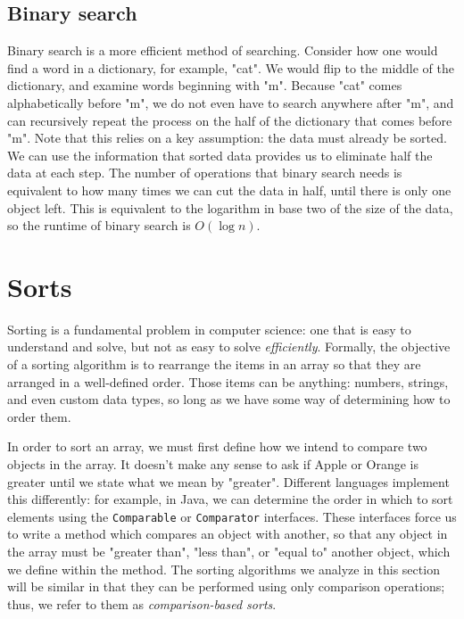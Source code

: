 \subsection{Binary search}

Binary search is a more efficient method of searching.  Consider how one would find a word in a dictionary, for example, "cat".  We would flip to the middle of the dictionary, and examine words beginning with "m".  Because "cat" comes alphabetically before "m", we do not even have to search anywhere after "m", and can recursively repeat the process on the half of the dictionary that comes before "m".  Note that this relies on a key assumption: the data must already be sorted.  We can use the information that sorted data provides us to eliminate half the data at each step.  The number of operations that binary search needs is equivalent to how many times we can cut the data in half, until there is only one object left.  This is equivalent to the logarithm in base two of the size of the data, so the runtime of binary search is $ O(\log n) $.


\section{Sorts} \label{sec:sorts}

Sorting is a fundamental problem in computer science: one that is easy to understand and solve, but not as easy to solve \textit{efficiently}. Formally, the objective of a sorting algorithm is to rearrange the items in an array so that they are arranged in a well-defined order. Those items can be anything: numbers, strings, and even custom data types, so long as we have some way of determining how to order them.

In order to sort an array, we must first define how we intend to compare two objects in the array.  It doesn't make any sense to ask if Apple or Orange is greater until we state what we mean by "greater".  Different languages implement this differently: for example, in Java, we can determine the order in which to sort elements using the \texttt{Comparable} or \texttt{Comparator} interfaces.  These interfaces force us to write a method which compares an object with another, so that any object in the array must be "greater than", "less than", or "equal to" another object, which we define within the method.  The sorting algorithms we analyze in this section will be similar in that they can be performed using only comparison operations; thus, we refer to them as \textit{comparison-based sorts}.


